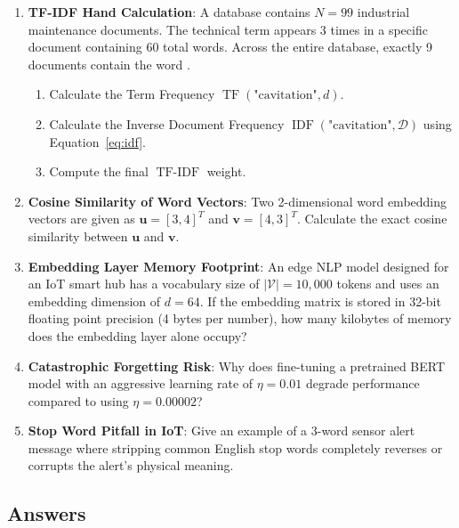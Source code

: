\begin{checkyourself}
\begin{enumerate}
    \item \textbf{TF-IDF Hand Calculation}: A database contains $N = 99$ industrial maintenance documents. The technical term  appears 3 times in a specific document containing 60 total words. Across the entire database, exactly 9 documents contain the word .
    \begin{enumerate}[label=(\alph*)]
        \item Calculate the Term Frequency $\operatorname{TF}(\text{"cavitation"}, d)$.
        \item Calculate the Inverse Document Frequency $\operatorname{IDF}(\text{"cavitation"}, \mathcal{D})$ using Equation~\eqref{eq:idf}.
        \item Compute the final $\operatorname{TF-IDF}$ weight.
    \end{enumerate}
    \item \textbf{Cosine Similarity of Word Vectors}: Two 2-dimensional word embedding vectors are given as $\mathbf{u} = [3, 4]^T$ and $\mathbf{v} = [4, 3]^T$. Calculate the exact cosine similarity between $\mathbf{u}$ and $\mathbf{v}$.
    \item \textbf{Embedding Layer Memory Footprint}: An edge NLP model designed for an IoT smart hub has a vocabulary size of $|\mathcal{V}| = 10{,}000$ tokens and uses an embedding dimension of $d = 64$. If the embedding matrix is stored in 32-bit floating point precision (4 bytes per number), how many kilobytes of memory does the embedding layer alone occupy?
    \item \textbf{Catastrophic Forgetting Risk}: Why does fine-tuning a pretrained BERT model with an aggressive learning rate of $\eta = 0.01$ degrade performance compared to using $\eta = 0.00002$?
    \item \textbf{Stop Word Pitfall in IoT}: Give an example of a 3-word sensor alert message where stripping common English stop words completely reverses or corrupts the alert's physical meaning.
\end{enumerate}
\end{checkyourself}

\subsection*{Answers}\label{subsec:answers}

